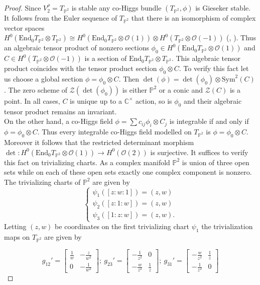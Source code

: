 \documentclass[12pt]{amsart}
\theoremstyle{definition}
\theoremstyle{remark}
\numberwithin{equation}{section}
\begin{document}
\begin{proof}
Since $V_2^\rho = T_{\mathbb{P}^2}$ is stable any co-Higgs bundle $(T_{\mathbb{P}^2}, \phi)$ is Gieseker stable. It follows from the Euler sequence of $T_{\mathbb{P}^2}$ that there is an isomorphism of complex vector spaces $H^0(\mbox{End}_0T_{\mathbb{P}^2}\otimes T_{\mathbb{P}^2})\cong H^0(\mbox{End}_0 T_{\mathbb{P}^2}\otimes\mathcal{O}(1))\otimes H^0(T_{\mathbb{P}^2}\otimes\mathcal{O}(-1))$ (\cite{Rayan}, \cite{Ste3}). Thus an algebraic tensor product of nonzero sections $\phi_0\in H^0(\mbox{End}_0 T_{\mathbb{P}^2}\otimes\mathcal{O}(1))$ and $C\in H^0(T_{\mathbb{P}^2}\otimes\mathcal{O}(-1))$ is a section of $\mbox{End}_0T_{\mathbb{P}^2}\otimes T_{\mathbb{P}^2}$. This algebraic tensor product coincides with the tensor product section $\phi_0\otimes C$. To verify this fact let us choose a global section $\phi = \phi_0\otimes C$. Then $\det(\phi) = \det(\phi_0)\otimes\mbox{Sym}^2(C)$. The zero scheme of $\mathcal{Z}(\det(\phi_0))$ is either $\mathbb{P}^2$ or a conic and $\mathcal{Z}(C)$ is a point. In all cases, $C$ is unique up to a $\mathbb{C}^\times$ action, so is $\phi_0$ and their algebraic tensor product remains an invariant.\\

On the other hand, a co-Higgs field $\phi = \sum c_{ij}\phi_i\otimes C_j$ is integrable if and only if $\phi = \phi_0\otimes C$. Thus every integrable co-Higgs field modelled on $T_{\mathbb{P}^2}$ is $\phi = \phi_0\otimes C$. Moreover it follows that the restricted determinant morphism $\det: H^0(\mbox{End}_0 T_{\mathbb{P}^2}\otimes \mathcal{O}(1))\to H^0(\mathcal{O}(2))$ is surjective. It suffices to verify this fact on trivializing charts. As a complex manifold $\mathbb{P}^2$ is union of three open sets while on each of these open sets exactly one complex component is nonzero. The trivializing charts of $\mathbb{P}^2$ are given by
\begin{equation}
\begin{cases}
\psi_1([z:w:1]) = (z, w)\\
\psi_2([z:1:w]) = (z, w)\\
\psi_3([1:z:w]) = (z, w).
\end{cases}
\end{equation}
Letting $(z, w)$ be coordinates on the first trivializing chart $\psi_1$ the trivialization maps on $T_{\mathbb{P}^2}$ are given by

\begin{equation}
g_{12}' = \begin{bmatrix}
\frac{1}{w} & -\frac{z}{w^2}\\
0 & -\frac{1}{w^2}
\end{bmatrix};~ g_{23}' = \begin{bmatrix}
-\frac{1}{z^2} & 0\\
-\frac{w}{z^2} & \frac{1}{z}
\end{bmatrix};~ g_{31}' = \begin{bmatrix}
    -\frac{w}{z^2} & \frac{1}{z}\\
    -\frac{1}{z^2} & 0
\end{bmatrix}
\end{equation}


\end{proof}
\end{document}
